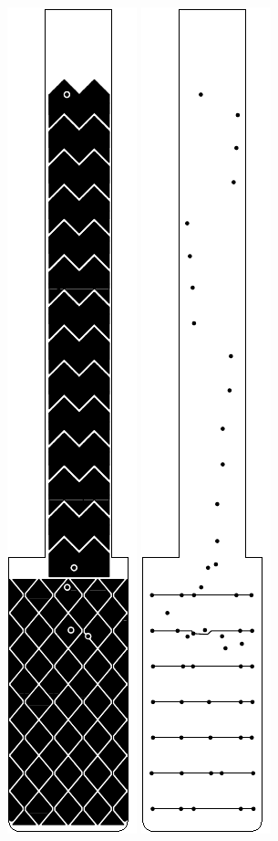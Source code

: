 \begin{figure}[t]
\centering
\includegraphics[width=0.18\columnwidth]{fig4a_touchkey-a_ly4.pdf}
\includegraphics[width=0.18\columnwidth]{fig4b_touchkey-a_ly3.pdf}

\end{figure}
